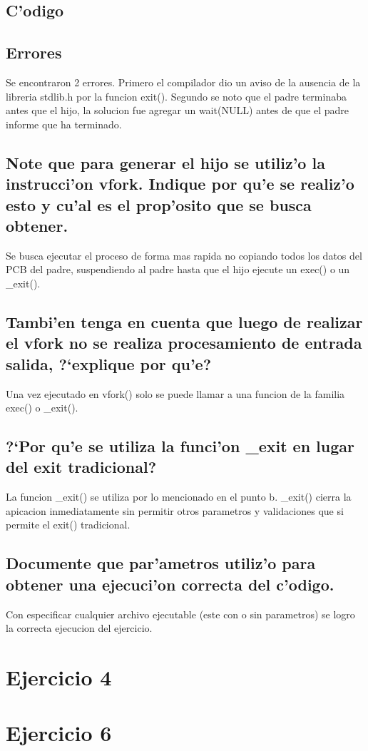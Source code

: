 \documentclass[a4paper,8pt]{article}
\newcommand{\?}{?`}
\begin{document}
\subsection{C'odigo}


\subsection{Errores}
Se encontraron 2 errores. Primero el compilador dio un aviso de la ausencia de la libreria stdlib.h por la funcion exit().
Segundo se noto que el padre terminaba antes que el hijo, la solucion fue agregar un wait(NULL) antes de que el padre informe que ha terminado.

\subsection[Punto A]{Note que para generar el hijo se utiliz'o la instrucci'on vfork. Indique por qu'e se realiz'o esto y cu'al es el prop'osito que se busca obtener.}
Se busca ejecutar el proceso de forma mas rapida no copiando todos los datos del PCB del padre, suspendiendo al padre hasta que el hijo ejecute un exec() o un \_exit().

\subsection[Punto B]{Tambi'en tenga en cuenta que luego de realizar el vfork no se realiza procesamiento de entrada salida, \?explique por qu'e?}
Una vez ejecutado en vfork() solo se puede llamar a una funcion de la familia exec() o \_exit().

\subsection[Punto C]{\?Por qu'e se utiliza la funci'on \_exit en lugar del exit tradicional?}
La funcion \_exit() se utiliza por lo mencionado en el punto b. \_exit() cierra la apicacion inmediatamente sin permitir otros parametros y validaciones que si permite el exit() tradicional.

\subsection[Punto D]{Documente que par'ametros utiliz'o para obtener una ejecuci'on correcta del c'odigo.}
Con especificar cualquier archivo ejecutable (este con o sin parametros) se logro la correcta ejecucion del ejercicio.

\section{Ejercicio 4}


\section{Ejercicio 6}

\end{document}
